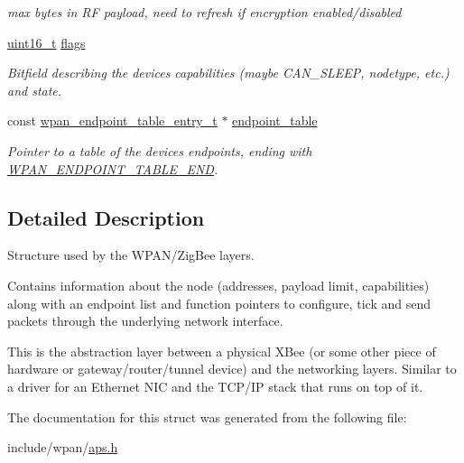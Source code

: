 \begin{DoxyCompactItemize}
\begin{DoxyCompactList}\small\item\em max bytes in RF payload, need to refresh if encryption enabled/disabled \end{DoxyCompactList}\item 
\hyperlink{group__hal__dos_ga5a8b2dc9e45a9ee81a94ef304fb62505}{uint16\+\_\+t} \hyperlink{group__wpan__aps_ga1e87af3c18a2fd36c61faf89949bdc3f}{flags}
\begin{DoxyCompactList}\small\item\em Bitfield describing the device\textquotesingle{}s capabilities (maybe C\+A\+N\+\_\+\+S\+L\+E\+EP, nodetype, etc.) and state. \end{DoxyCompactList}\item 
const \hyperlink{structwpan__endpoint__table__entry__t}{wpan\+\_\+endpoint\+\_\+table\+\_\+entry\+\_\+t} $\ast$ \hyperlink{group__wpan__aps_gad7c834ea25a2f008caaf40ec08aa5a86}{endpoint\+\_\+table}
\begin{DoxyCompactList}\small\item\em Pointer to a table of the device\textquotesingle{}s endpoints, ending with \hyperlink{group__wpan__aps_gaac571cafa96f8201c714feb0634afa92}{W\+P\+A\+N\+\_\+\+E\+N\+D\+P\+O\+I\+N\+T\+\_\+\+T\+A\+B\+L\+E\+\_\+\+E\+ND}. \end{DoxyCompactList}\end{DoxyCompactItemize}


\subsection{Detailed Description}
Structure used by the W\+P\+A\+N/\+Zig\+Bee layers. 

Contains information about the node (addresses, payload limit, capabilities) along with an endpoint list and function pointers to configure, tick and send packets through the underlying network interface.

This is the abstraction layer between a physical X\+Bee (or some other piece of hardware or gateway/router/tunnel device) and the networking layers. Similar to a driver for an Ethernet N\+IC and the T\+C\+P/\+IP stack that runs on top of it. 

The documentation for this struct was generated from the following file\+:\begin{DoxyCompactItemize}
\item 
include/wpan/\hyperlink{aps_8h}{aps.\+h}\end{DoxyCompactItemize}
